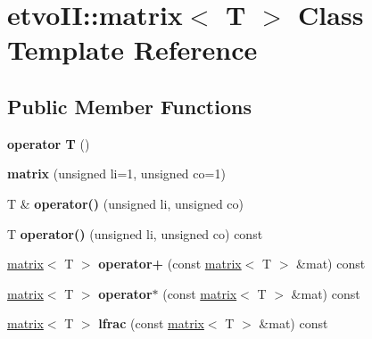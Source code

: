 \hypertarget{classetvo_i_i_1_1matrix}{}\section{etvo\+II\+:\+:matrix$<$ T $>$ Class Template Reference}
\label{classetvo_i_i_1_1matrix}
\subsection*{Public Member Functions}
\begin{DoxyCompactItemize}
\item 
\mbox{\label{classetvo_i_i_1_1matrix_afd7d69ed3bbae7d524e850ac13ec4ac8}} 
{\bfseries operator T} ()
\item 
\mbox{\label{classetvo_i_i_1_1matrix_a94e3340d596dccb804be55a791e7c40c}} 
{\bfseries matrix} (unsigned li=1, unsigned co=1)
\item 
\mbox{\label{classetvo_i_i_1_1matrix_a1c6e2bdb5f36125ace183ef2c0b8384a}} 
T \& {\bfseries operator()} (unsigned li, unsigned co)
\item 
\mbox{\label{classetvo_i_i_1_1matrix_aabea634af0454bcf58867ff155a7f764}} 
T {\bfseries operator()} (unsigned li, unsigned co) const
\item 
\mbox{\label{classetvo_i_i_1_1matrix_a6d14e19a2c42197b91aff8ba6490676c}} 
\mbox{\hyperlink{classetvo_i_i_1_1matrix}{matrix}}$<$ T $>$ {\bfseries operator+} (const \mbox{\hyperlink{classetvo_i_i_1_1matrix}{matrix}}$<$ T $>$ \&mat) const
\item 
\mbox{\label{classetvo_i_i_1_1matrix_a1a3e5c841be234955c330a84fa289ec7}} 
\mbox{\hyperlink{classetvo_i_i_1_1matrix}{matrix}}$<$ T $>$ {\bfseries operator$\ast$} (const \mbox{\hyperlink{classetvo_i_i_1_1matrix}{matrix}}$<$ T $>$ \&mat) const
\item 
\mbox{\label{classetvo_i_i_1_1matrix_a76a39a436002a07fb8124501029a5e9d}} 
\mbox{\hyperlink{classetvo_i_i_1_1matrix}{matrix}}$<$ T $>$ {\bfseries lfrac} (const \mbox{\hyperlink{classetvo_i_i_1_1matrix}{matrix}}$<$ T $>$ \&mat) const

\end{DoxyCompactItemize}
